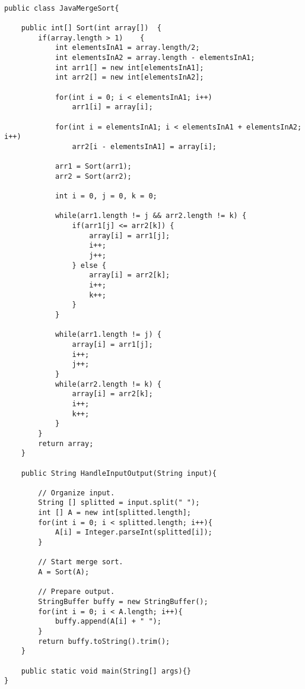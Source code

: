 	\lstset{style=java}
	\begin{lstlisting}

public class JavaMergeSort{
	
	public int[] Sort(int array[])  {
		if(array.length > 1)  	{
			int elementsInA1 = array.length/2;
			int elementsInA2 = array.length - elementsInA1;
			int arr1[] = new int[elementsInA1];
			int arr2[] = new int[elementsInA2];

			for(int i = 0; i < elementsInA1; i++)
				arr1[i] = array[i];

			for(int i = elementsInA1; i < elementsInA1 + elementsInA2; i++)
				arr2[i - elementsInA1] = array[i];

			arr1 = Sort(arr1);
			arr2 = Sort(arr2);

			int i = 0, j = 0, k = 0;

			while(arr1.length != j && arr2.length != k) {
				if(arr1[j] <= arr2[k]) {
					array[i] = arr1[j];
					i++;
					j++;
				} else {
					array[i] = arr2[k];
					i++;
					k++;
				}
			}

			while(arr1.length != j) {
				array[i] = arr1[j];
				i++;
				j++;
			}
			while(arr2.length != k) {
				array[i] = arr2[k];
				i++;
				k++;
			}
		}
		return array;
	}

	public String HandleInputOutput(String input){

		// Organize input. 
		String [] splitted = input.split(" ");
		int [] A = new int[splitted.length];
		for(int i = 0; i < splitted.length; i++){
			A[i] = Integer.parseInt(splitted[i]);
		}

		// Start merge sort.
		A = Sort(A);

		// Prepare output.
		StringBuffer buffy = new StringBuffer();
		for(int i = 0; i < A.length; i++){
			buffy.append(A[i] + " ");
		}
		return buffy.toString().trim();
	}
	
	public static void main(String[] args){}
}

	\end{lstlisting}

